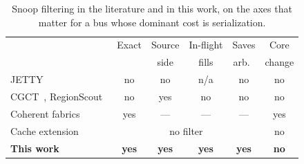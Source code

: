 \begin{table}[t]
\caption{Snoop filtering in the literature and in this work, on the axes that
matter for a bus whose dominant cost is serialization.}
\label{tab:related}
\centering
\scriptsize
\setlength{\tabcolsep}{3pt}
\begin{tabular}{@{}lccccc@{}}
\toprule
 & Exact & Source & In-flight & Saves & Core \\
 &       & side   & fills     & arb.\  & change \\
\midrule
JETTY~\cite{jetty}                  & no  & no  & n/a & no  & no \\
CGCT~\cite{cgct}, RegionScout~\cite{regionscout}
                                    & no  & yes & no  & no  & no \\
Coherent fabrics~\cite{tilelink,openpiton,cifer}
                                    & yes & ---  & --- & --- & yes \\
Cache extension~\cite{kamaleldin2024}
                                    & \multicolumn{4}{c}{no filter} & no \\
\textbf{This work}                  & \textbf{yes} & \textbf{yes} & \textbf{yes}
                                    & \textbf{yes} & \textbf{no} \\
\bottomrule
\end{tabular}
\end{table}
